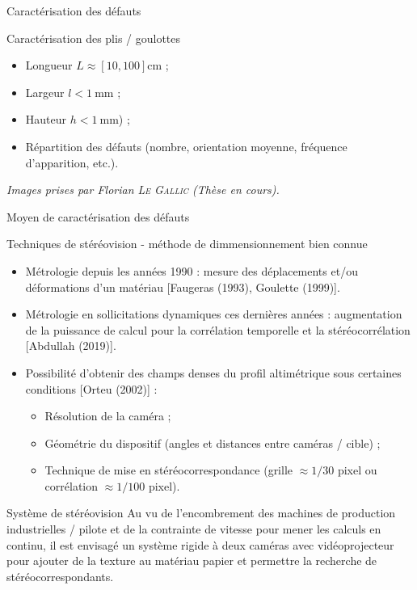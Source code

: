 \documentclass[8pt]{beamer}
\begin{document}
\begin{frame}{Caractérisation des défauts}
\begin{minipage}[c]{.57\linewidth}
\begin{block}{Caractérisation des plis / goulottes}
\begin{itemize}
					\item Longueur $L \approx \left[10, 100\right]$\si{\centi\meter} ;
					\item Largeur $l < \SI{1}{\milli\meter}$ ;
					\item Hauteur $h < \SI{1}{\milli\meter}$) ;
					\item Répartition des défauts (nombre, orientation moyenne, fréquence d'apparition, etc.).
				\end{itemize}
			\end{block}\vspace{2em}
			\textit{Images prises par Florian \textsc{Le Gallic} (Thèse en cours).}
		\end{minipage}
	\end{frame}
	\begin{frame}{Moyen de caractérisation des défauts}
		\begin{block}{Techniques de stéréovision - méthode de dimmensionnement bien connue}
			\begin{itemize}
				\item Métrologie depuis les années 1990 : mesure des déplacements et/ou déformations d'un matériau [Faugeras (1993), Goulette (1999)].
				\item Métrologie en sollicitations dynamiques ces dernières années : augmentation de la puissance de calcul pour la corrélation temporelle et la stéréocorrélation [Abdullah (2019)].
				\item Possibilité d'obtenir des champs denses du profil altimétrique sous certaines conditions [Orteu (2002)] :
				\begin{itemize}
					\item Résolution de la caméra ;
					\item Géométrie du dispositif (angles et distances entre caméras / cible) ;
					\item Technique de mise en stéréocorrespondance (grille $\approx 1/30$ pixel ou corrélation $\approx 1/100$ pixel).
				\end{itemize}
			\end{itemize}
		\end{block}
		\begin{block}{Système de stéréovision}
			Au vu de l'encombrement des machines de production industrielles / pilote et de la contrainte de vitesse pour mener les calculs en continu, il est envisagé un système rigide à deux caméras avec vidéoprojecteur pour ajouter de la texture au matériau papier et permettre la recherche de stéréocorrespondants.
		\end{block}
	\end{frame}
\end{document}
